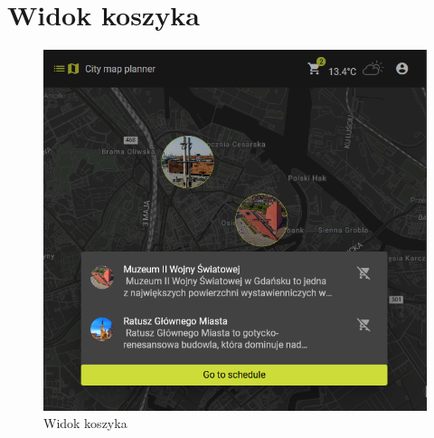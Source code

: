 \section{Widok koszyka}
\label{sec:koszyk}
    \begin{figure}[H]
        \centering
        \includegraphics[width=1\textwidth]{attachments/koszyk}
        \caption{Widok koszyka}
        \label{fig:koszyk}
\end{figure}

